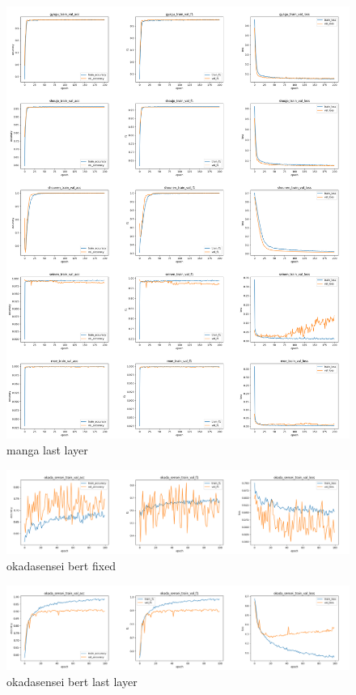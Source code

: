 \documentclass[twocolumn]{jarticle}     %
\begin{document}
\clearpage
\begin{figure}[h]
  \begin{center} %
    \includegraphics[width=14.0cm]{bert_last_layer.png}
    \caption{manga last layer} %
    \label{fig:manga_last_layer} %
  \end{center}
\end{figure}

\clearpage
\begin{figure}[h]
  \begin{center} %
    \includegraphics[width=14.0cm]{oakada_sensei_fixed.png}
    \caption{okadasensei bert fixed} %
    \label{okadasensei_bert_fixed} %
  \end{center}
\end{figure}

\begin{figure}[h]
  \begin{center} %
    \includegraphics[width=14.0cm]{okada_sensei_last_layer.png}
    \caption{okadasensei bert last layer} %
    \label{okadasensei_bert_last_layer} %
  \end{center}
\end{figure}
\end{document}
